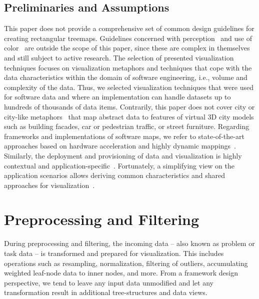 \documentclass[sigconf]{acmart}
\def\ie{i.e., }
\begin{document}
\subsection{Preliminaries and Assumptions}
This paper does not provide a comprehensive set of common design guidelines for creating rectangular treemaps.
Guidelines concerned with perception~\cite{kong2010-guidelines} and use of color~\cite{schloss2018-colormap,xie2017-coloraesthetics,quinan2019-discretization} are outside the scope of this paper, since these are complex in themselves and still subject to active research.
The selection of presented visualization techniques focuses on visualization metaphors and techniques that cope with the data characteristics within the domain of software engineering, \ie volume and complexity of the data.
Thus, we selected visualization techniques that were used for software data and where an implementation can handle datasets up to hundreds of thousands of data items.
Contrarily, this paper does not cover city or city-like metaphors~\cite{knight1999-comprehension,balogh2015-codemetropolis} that map abstract data to features of virtual 3D city models such as building facades, car or pedestrian traffic, or street furniture.
Regarding frameworks and implementations of software maps, we refer to state-of-the-art approaches based on hardware acceleration and highly dynamic mappings~\cite{trapp2013-gputreemaps,scheibel2016-avcs}.
Similarly, the deployment and provisioning of data and visualization is highly contextual and application-specific~\cite{limberger2013-interactive,limberger2016-declarative3d}.
Fortunately, a simplifying view on the application scenarios allows deriving common characteristics and shared approaches for visualization~\cite{scheibel2019-hiviser}.

\section{Preprocessing and Filtering}
\label{VINCI:Sec:Preprocessing}
\par
During preprocessing and filtering, the incoming data -- also known as problem or task data -- is transformed and prepared for visualization.
This includes operations such as resampling, normalization, filtering of outliers, accumulating weighted leaf-node data to inner nodes, and more.
From a framework design perspective, we tend to leave any input data unmodified and let any transformation result in additional tree-structures and data views.
\end{document}
